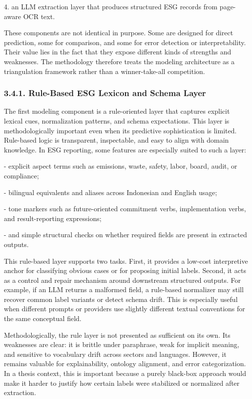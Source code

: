 \documentclass{article}
\begin{document}
4. an LLM extraction layer that produces structured ESG records from page-aware OCR text.

These components are not identical in purpose. Some are designed for direct prediction, some for comparison, and some for error detection or interpretability. Their value lies in the fact that they expose different kinds of strengths and weaknesses. The methodology therefore treats the modeling architecture as a triangulation framework rather than a winner-take-all competition.
\subsubsection*{3.4.1. Rule-Based ESG Lexicon and Schema Layer}

The first modeling component is a rule-oriented layer that captures explicit lexical cues, normalization patterns, and schema expectations. This layer is methodologically important even when its predictive sophistication is limited. Rule-based logic is transparent, inspectable, and easy to align with domain knowledge. In ESG reporting, some features are especially suited to such a layer:

- explicit aspect terms such as emissions, waste, safety, labor, board, audit, or compliance;

- bilingual equivalents and aliases across Indonesian and English usage;

- tone markers such as future-oriented commitment verbs, implementation verbs, and result-reporting expressions;

- and simple structural checks on whether required fields are present in extracted outputs.

This rule-based layer supports two tasks. First, it provides a low-cost interpretive anchor for classifying obvious cases or for proposing initial labels. Second, it acts as a control and repair mechanism around downstream structured outputs. For example, if an LLM returns a malformed field, a rule-based normalizer may still recover common label variants or detect schema drift. This is especially useful when different prompts or providers use slightly different textual conventions for the same conceptual field.

Methodologically, the rule layer is not presented as sufficient on its own. Its weaknesses are clear: it is brittle under paraphrase, weak for implicit meaning, and sensitive to vocabulary drift across sectors and languages. However, it remains valuable for explainability, ontology alignment, and error categorization. In a thesis context, this is important because a purely black-box approach would make it harder to justify how certain labels were stabilized or normalized after extraction.
\end{document}
